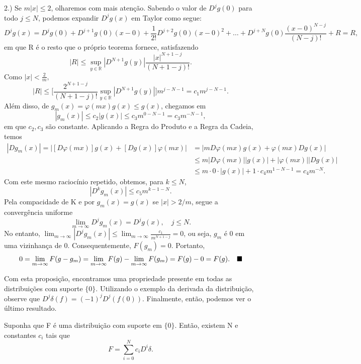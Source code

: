 \documentclass[measure_theory.tex]{subfiles}
\begin{document}
\begin{proof*}
	2.) Se \(m|x| \leq 2 \), olharemos com mais atenção. Sabendo o valor de \(D^{j}g(0)\) para todo \(j\leq N\), podemos expandir \(D^{j}g(x)\) em Taylor como segue:
	\[
		D^{j}g(x) = D^{j}g(0) + D^{j+1}g(0)(x-0) + \frac{1}{2!}D^{j+2}g(0)(x-0)^{2} + \dotsc + D^{j+N}g(0)\frac{(x-0)^{N-j}}{(N-j)!} + R = R,
	\]
	em que R é o resto que o próprio teorema fornece, satisfazendo
	\[
		|R|\leq \sup_{y\in \mathbb{R}}|D^{N+1}g(y)|\frac{|x|^{N+1-j}}{(N+1-j)!}.
	\]
	Como \(|x| < \frac{2}{m},\)
	\[
		|R|\leq \biggl[\frac{2^{N+1-j}}{(N+1-j)!}\sup_{y\in \mathbb{R}}|D^{N+1}g(y)|\biggr]m^{j-N-1} = c_{1}m^{j-N-1}.
	\]
	Além disso, de \(g_{m}(x) = \varphi (mx)g(x)\leq g(x)\), chegamos em
	\[
		|g_{m}(x)|\leq c_{2}|g(x)|\leq c_3m^{0 - N - 1} = c_{3}m^{-N-1},
	\]
	em que \(c_2, c_3\) são constante. Aplicando a Regra do Produto e a Regra da Cadeia, temos
	\begin{align*}
		|Dg_{m}(x)| = |[D\varphi (mx)]g(x) + [Dg(x)]\varphi (mx)| & = |mD\varphi(mx)g(x) + \varphi (mx)Dg(x)|                        \\
		                                                          & \leq m|D\varphi (mx)||g(x)|+|\varphi (mx)||Dg(x)|                \\
		                                                          & \leq m \cdot 0 \cdot |g(x)| + 1 \cdot c_4 m^{1-N-1} = c_4m^{-N}.
	\end{align*}
	Com este mesmo raciocínio repetido, obtemos, para \(k\leq N\),
	\[
		|D^{k}g_m(x)| \leq c_5m^{k-1-N}.
	\]
	Pela compacidade de K e por \(g_m(x) = g(x)\) se \(|x|>2/m\), segue a convergência uniforme
	\[
		\lim_{m\to \infty}D^{j}g_{m}(x) = D^{j}g(x),\quad j\leq N.
	\]
	No entanto, \(\lim_{m\to \infty}|D^{j}g_{m}(x)|\leq \lim_{m\to \infty}\frac{c_1}{m^{N+1-j}} = 0\), ou seja, \(g_m\) é 0 em uma vizinhança de 0. Consequentemente, \(F(g_m) = 0\). Portanto,
	\[
		0 = \lim_{m\to \infty}F(g-g_m) = \lim_{m\to \infty}F(g) - \lim_{m\to \infty}F(g_m) = F(g) - 0 = F(g).\quad \text{$\blacksquare$}
	\]
\end{proof*}
Com esta proposição, encontramos uma propriedade presente em todas as distribuições com suporte \(\{0\}.\) Utilizando o exemplo da derivada da distribuição, observe que \(D^{j}\delta (f) = (-1)^{j}D^{j}(f(0)).\)
Finalmente, então, podemos ver o último resultado.
\begin{theorem*}
	Suponha que F é uma distribuição com suporte em \(\{0\}.\) Então, existem N e constantes \(c_{i}\) tais que
	\[
		F = \sum\limits_{i=0}^{N}c_{i}D^{i}\delta .
	\]
\end{theorem*}
\end{document}

